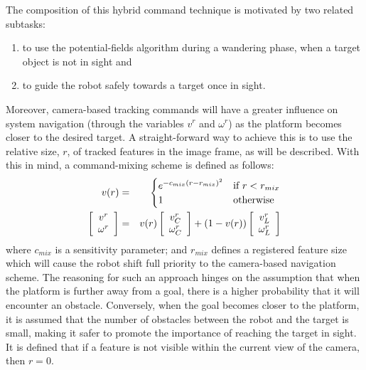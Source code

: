 			The composition of this hybrid command technique is motivated by two related subtasks: 
				\begin{enumerate}
				\item to use the potential-fields algorithm during a wandering phase, when a target object is not in sight and
				\item to guide the robot safely towards a target once in sight.
				\end{enumerate}
			Moreover, camera-based tracking commands will have a greater influence on system navigation (through the variables $v^{r}$ and $\omega^{r}$) as the platform becomes closer to the desired target. A straight-forward way to achieve this is to use the relative size, $r$, of tracked features in the image frame, as will be described. With this in mind, a command-mixing scheme is defined as follows:
			\begin{eqnarray}
				v(r) &=&
				\begin{cases}
				e^{ -c_{mix} \left( r - r_{mix}\right)^{2} } 	& \text{if } r < r_{mix}	\\
				1											& \text{otherwise}
				\end{cases}
								\nonumber \\
						\left[\begin{array}{c} v^{r} 	\\ \omega^{r} 		\end{array} \right] &=& 	
				v(r)	\left[\begin{array}{c} v^{r}_{C}\\ \omega^{r}_{C} 	\end{array} \right] + 
				(1-v(r))\left[\begin{array}{c} v^{r}_{L}\\ \omega^{r}_{L} 	\end{array} \right] 
			\end{eqnarray}
			where $c_{mix}$ is a sensitivity parameter; and $r_{mix}$ defines a registered feature size which will cause the robot shift full priority to the camera-based navigation scheme. The reasoning for such an approach hinges on the assumption that when the platform is further away from a goal, there is a higher probability that it will encounter an obstacle. Conversely, when the goal becomes closer to the platform, it is assumed that the number of obstacles between the robot and the target is small, making it safer to promote the importance of reaching the target in sight. It is defined that if a feature is not visible within the current view of the camera, then $r=0$.

